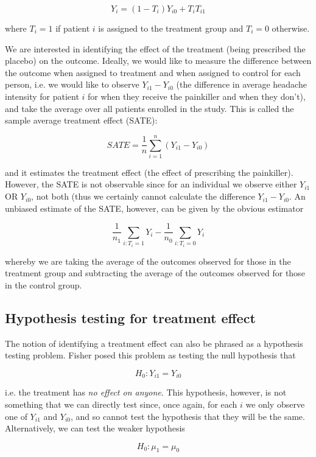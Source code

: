 $$Y_i = (1 - T_i) Y_{i0} + T_i T_{i1}$$

where $T_i = 1$ if patient $i$ is assigned to the treatment group and $T_i = 0$ otherwise.


We are interested in identifying the effect of the treatment (being prescribed the placebo) on the outcome. Ideally, we would like to measure the difference between the outcome when assigned to treatment and when assigned to control for each person, i.e. we would like to observe $Y_{i1} - Y_{i0}$ (the difference in average headache intensity for patient $i$ for when they receive the painkiller and when they don't), and take the average over all patients enrolled in the study. This is called the sample average treatment effect (SATE):

$$SATE = \frac{1}{n}\sum_{i=1}^n (Y_{i1} - Y_{i0})$$

and it estimates the treatment effect (the effect of prescribing the painkiller). However, the SATE is not observable since for an individual we observe either $Y_{i1}$ OR $Y_{i0}$, not both (thus we certainly cannot calculate the difference $Y_{i1} - Y_{i0}$. An unbiased estimate of the SATE, however, can be given by the obvious estimator

$$\frac{1}{n_1} \sum_{i:T_i = 1} Y_{i} - \frac{1}{n_0} \sum_{i:T_i = 0} Y_{i}$$

whereby we are taking the average of the outcomes observed for those in the treatment group and subtracting the average of the outcomes observed for those in the control group. 



\subsection*{Hypothesis testing for treatment effect}



The notion of identifying a treatment effect can also be phrased as a hypothesis testing problem. Fisher posed this problem as testing the null hypothesis that

$$H_0: Y_{i1} = Y_{i0}$$

i.e. the treatment has \emph{no effect on anyone}. This hypothesis, however, is not something that we can directly test since, once again, for each $i$ we only observe one of $Y_{i1}$ and $Y_{i0}$, and so cannot test the hypothesis that they will be the same. Alternatively, we can test the weaker hypothesis 

$$H_0: \mu_1 = \mu_0$$

